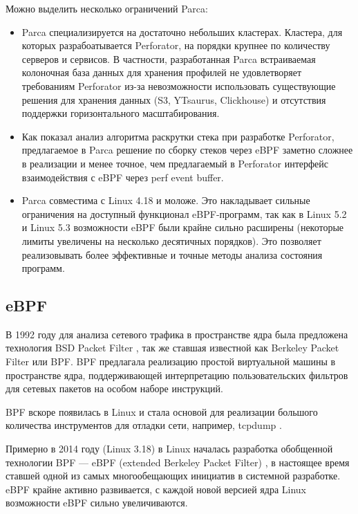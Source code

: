 Можно выделить несколько ограничений Parca:
\begin{itemize}
    \item
        Parca специализируется на достаточно небольших кластерах. Кластера, для которых разрабоатывается Perforator, на порядки крупнее
        по количеству серверов и сервисов. В частности, разработанная Parca встраиваемая колоночная база данных для хранения профилей
        не удовлетворяет требованиям Perforator из-за невозможности использовать существующие решения для хранения данных
        (S3, YTsaurus, Clickhouse) и отсутствия поддержки горизонтального масштабирования.

    \item
        Как показал анализ алгоритма раскрутки стека при разработке Perforator, предлагаемое в Parca решение по сборку стеков через eBPF
        заметно сложнее в реализации и менее точное, чем предлагаемый в Perforator интерфейс взаимодействия с eBPF через perf event buffer.

    \item
        Parca совместима с Linux 4.18 и моложе. Это накладывает сильные ограничения на доступный функционал eBPF-программ, так как в
        Linux 5.2 и Linux 5.3 возможности eBPF были крайне сильно расширены (некоторые лимиты увеличены на несколько десятичных порядков).
        Это позволяет реализовывать более эффективные и точные методы анализа состояния программ.
\end{itemize}

\subsection{eBPF} \label{sec:ebpf}
В 1992 году для анализа сетевого трафика в пространстве ядра была предложена технология BSD Packet Filter \cite{bpf},
так же ставшая известной как Berkeley Packet Filter или BPF.
BPF предлагала реализацию простой виртуальной машины в пространстве ядра, поддерживающей интерпретацию пользовательских фильтров для
сетевых пакетов на особом наборе инструкций.

BPF вскоре появилась в Linux и стала основой для реализации большого количества инструментов для отладки сети,
например, tcpdump \cite{tcpdump, tcpdump:bpf}.

Примерно в 2014 году (Linux 3.18) в Linux началась разработка обобщенной технологии BPF ---
eBPF (extended Berkeley Packet Filter) \cite{ebpf:kernel, ebpf:cilium},
в настоящее время ставшей одной из самых многообещающих инициатив в системной разработке.
eBPF крайне активно развивается, с каждой новой версией ядра Linux возможности eBPF сильно увеличиваются.

